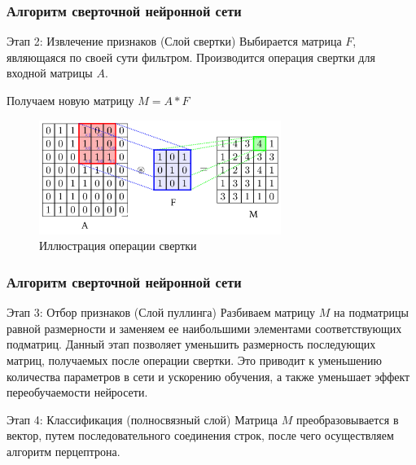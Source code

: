 \documentclass{beamer}
\begin{document}
\begin{frame}
	\frametitle{Алгоритм сверточной нейронной сети}	
	\begin{block}{Этап 2: Извлечение признаков (Слой свертки)}
		Выбирается матрица $F$, являющаяся по своей сути фильтром. Производится операция свертки для входной матрицы $A$. 
		
		Получаем новую матрицу $M = A * F$
	\end{block}	
	
	\begin{figure}[p]
		\centering
		
		\includegraphics[width=0.7\textwidth]{conv1.png}
		\caption{Иллюстрация операции свертки}
	\end{figure}
\end{frame}



\begin{frame}
	\frametitle{Алгоритм сверточной нейронной сети}	
	\begin{block}{Этап 3: Отбор признаков (Слой пуллинга)}
		Разбиваем матрицу $M$ на подматрицы равной размерности и заменяем ее наибольшими элементами соответствующих подматриц. Данный этап позволяет уменьшить размерность последующих матриц, получаемых после операции свертки. Это приводит к уменьшению количества параметров в сети и ускорению обучения, а также уменьшает эффект переобучаемости нейросети.
	\end{block}	
	\begin{block}{Этап 4: Классификация (полносвязный слой)}
		Матрица $M$ преобразовывается в вектор, путем последовательного соединения строк, после чего осуществляем алгоритм перцептрона. 
	\end{block}	
	
\end{frame}
\end{document}
